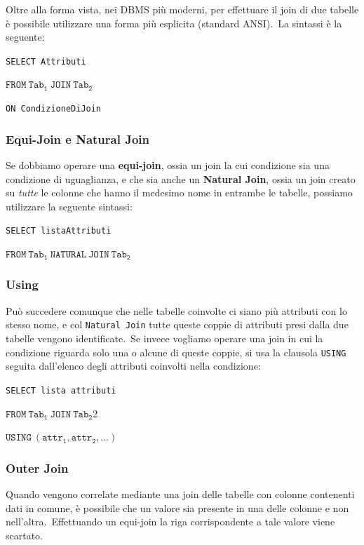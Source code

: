 Oltre alla forma vista, nei DBMS più moderni, per effettuare il join di due tabelle è possibile utilizzare una forma più esplicita (standard ANSI).\ La sintassi è la seguente:
\begin{flushleft}
	\texttt{SELECT Attributi}

	$\mathtt{FROM\ Tab_1\ JOIN\ Tab_2}$

	\texttt{ON CondizioneDiJoin}
\end{flushleft}

\subsubsection{Equi-Join e Natural Join}

Se dobbiamo operare una \textbf{equi-join}, ossia un join la cui condizione sia una condizione di uguaglianza, e che sia anche un \textbf{Natural Join}, ossia un join creato su \textit{tutte} le colonne che hanno il medesimo nome in entrambe le tabelle, possiamo utilizzare la seguente sintassi:

\begin{flushleft}
	\texttt{SELECT listaAttributi}

	$\mathtt{FROM\ Tab_1\ NATURAL\ JOIN\ Tab_2}$
\end{flushleft}

\subsubsection{Using}

Può succedere comunque che nelle tabelle coinvolte ci siano più attributi con lo stesso nome, e col \texttt{Natural Join} tutte queste coppie di attributi presi dalla due tabelle vengono identificate.\
Se invece vogliamo operare una join in cui la condizione riguarda solo una o alcune di queste coppie, si usa la clausola \texttt{USING} seguita dall'elenco degli attributi coinvolti nella condizione:
\begin{flushleft}
	\texttt{SELECT lista attributi}

	$\mathtt{FROM\ Tab_1\ JOIN\ Tab_2}$2

	$\mathtt{USING\ (attr_1,attr_2,\dots)}$
\end{flushleft}

\subsubsection{Outer Join}
Quando vengono correlate mediante una join delle tabelle con colonne contenenti dati in comune, è possibile che un valore sia presente in una delle colonne e non nell'altra.\
Effettuando un equi-join la riga corrispondente a tale valore viene scartato.\

